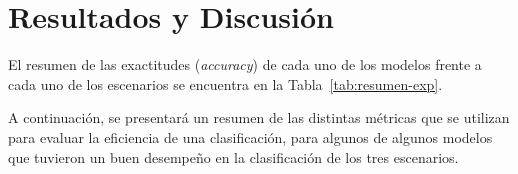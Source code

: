 \section{Resultados y Discusión}
El resumen de las exactitudes (\textit{accuracy}) de cada uno de los modelos frente a cada uno de los escenarios se encuentra en la Tabla~\ref{tab:resumen-exp}.



A continuación, se presentará un resumen de las distintas métricas que se utilizan para evaluar la eficiencia de una clasificación, para algunos de algunos modelos que tuvieron un buen desempeño en la clasificación de los tres escenarios.





